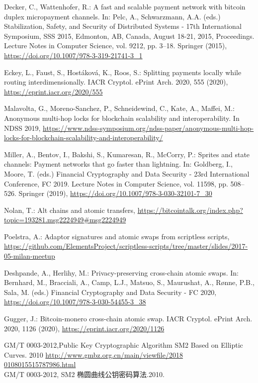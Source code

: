 \documentclass[review]{jcr}
\begin{document}
\begin{thebibliography}{10}
Decker, C., Wattenhofer, R.: A fast and scalable payment network with bitcoin
  duplex micropayment channels. In: Pelc, A., Schwarzmann, A.A. (eds.)
  Stabilization, Safety, and Security of Distributed Systems - 17th
  International Symposium, {SSS} 2015, Edmonton, AB, Canada, August 18-21,
  2015, Proceedings. Lecture Notes in Computer Science, vol. 9212, pp. 3--18.
  Springer (2015), \url{https://doi.org/10.1007/978-3-319-21741-3\_1}

Eckey, L., Faust, S., Host{\'{a}}kov{\'{a}}, K., Roos, S.: Splitting payments
  locally while routing interdimensionally. {IACR} Cryptol. ePrint Arch.  2020,
   555 (2020), \url{https://eprint.iacr.org/2020/555}

Malavolta, G., Moreno{-}Sanchez, P., Schneidewind, C., Kate, A., Maffei, M.:
  Anonymous multi-hop locks for blockchain scalability and interoperability.
  In {NDSS} 2019,
  \url{https://www.ndss-symposium.org/ndss-paper/anonymous-multi-hop-locks-for-blockchain-scalability-and-interoperability/}

Miller, A., Bentov, I., Bakshi, S., Kumaresan, R., McCorry, P.: Sprites and
  state channels: Payment networks that go faster than lightning. In: Goldberg,
  I., Moore, T. (eds.) Financial Cryptography and Data Security - 23rd
  International Conference, {FC} 2019. Lecture Notes in Computer
  Science, vol. 11598, pp. 508--526. Springer (2019),
  \url{https://doi.org/10.1007/978-3-030-32101-7\_30}

Nolan, T.: Alt chains and atomic transfers, \url{https://bitcointalk.org/index.php? topic=193281.msg2224949#msg2224949}

Poelstra, A.: Adaptor signatures and atomic swaps from scriptless scripts,
\url{https://github.com/ElementsProject/scriptless-scripts/tree/master/slides/2017-05-milan-meetup}

Deshpande, A., Herlihy, M.: Privacy-preserving cross-chain atomic swaps. In:
  Bernhard, M., Bracciali, A., Camp, L.J., Matsuo, S., Maurushat, A., R{\o}nne,
  P.B., Sala, M. (eds.) Financial Cryptography and Data Security - {FC} 2020,
  \url{https://doi.org/10.1007/978-3-030-54455-3\_38}

Gugger, J.: Bitcoin-monero cross-chain atomic swap. {IACR} Cryptol. ePrint
  Arch.  2020,  1126 (2020), \url{https://eprint.iacr.org/2020/1126}

 GM/T 0003-2012,Public Key Cryptographic Algorithm SM2 Based on Elliptic Curves. 2010 
  \url{http://www.gmbz.org.cn/main/viewfile/2018 0108015515787986.html} \\
  GM/T 0003-2012, SM2 椭圆曲线公钥密码算法.2010.


\end{thebibliography}
\end{document}
